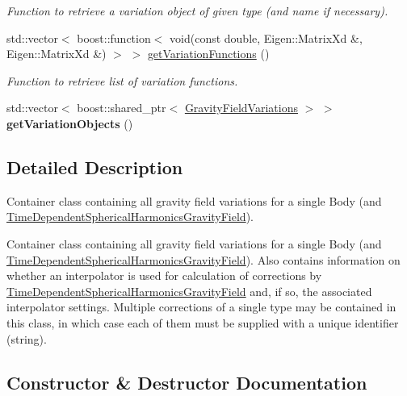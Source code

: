 \begin{DoxyCompactItemize}
\begin{DoxyCompactList}\small\item\em Function to retrieve a variation object of given type (and name if necessary). \end{DoxyCompactList}\item 
std\+::vector$<$ boost\+::function$<$ void(const double, Eigen\+::\+Matrix\+Xd \&, Eigen\+::\+Matrix\+Xd \&) $>$ $>$ \hyperlink{classtudat_1_1gravitation_1_1GravityFieldVariationsSet_a6528ab72696d37853ffde47a49a4c424}{get\+Variation\+Functions} ()
\begin{DoxyCompactList}\small\item\em Function to retrieve list of variation functions. \end{DoxyCompactList}\item 
std\+::vector$<$ boost\+::shared\+\_\+ptr$<$ \hyperlink{classtudat_1_1gravitation_1_1GravityFieldVariations}{Gravity\+Field\+Variations} $>$ $>$ {\bfseries get\+Variation\+Objects} ()\hypertarget{classtudat_1_1gravitation_1_1GravityFieldVariationsSet_aa1d5966d493c2cd42489445e72313c63}{}\label{classtudat_1_1gravitation_1_1GravityFieldVariationsSet_aa1d5966d493c2cd42489445e72313c63}

\end{DoxyCompactItemize}


\subsection{Detailed Description}
Container class containing all gravity field variations for a single Body (and \hyperlink{classtudat_1_1gravitation_1_1TimeDependentSphericalHarmonicsGravityField}{Time\+Dependent\+Spherical\+Harmonics\+Gravity\+Field}).

Container class containing all gravity field variations for a single Body (and \hyperlink{classtudat_1_1gravitation_1_1TimeDependentSphericalHarmonicsGravityField}{Time\+Dependent\+Spherical\+Harmonics\+Gravity\+Field}). Also contains information on whether an interpolator is used for calculation of corrections by \hyperlink{classtudat_1_1gravitation_1_1TimeDependentSphericalHarmonicsGravityField}{Time\+Dependent\+Spherical\+Harmonics\+Gravity\+Field} and, if so, the associated interpolator settings. Multiple corrections of a single type may be contained in this class, in which case each of them must be supplied with a unique identifier (string). 

\subsection{Constructor \& Destructor Documentation}
